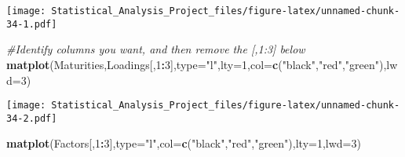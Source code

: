 \documentclass[]{article}
\newenvironment{Shaded}{\begin{snugshade}}{\end{snugshade}}
\newcommand{\KeywordTok}[1]{\textcolor[rgb]{0.13,0.29,0.53}{\textbf{#1}}}
\newcommand{\DataTypeTok}[1]{\textcolor[rgb]{0.13,0.29,0.53}{#1}}
\newcommand{\DecValTok}[1]{\textcolor[rgb]{0.00,0.00,0.81}{#1}}
\newcommand{\StringTok}[1]{\textcolor[rgb]{0.31,0.60,0.02}{#1}}
\newcommand{\CommentTok}[1]{\textcolor[rgb]{0.56,0.35,0.01}{\textit{#1}}}
\newcommand{\OperatorTok}[1]{\textcolor[rgb]{0.81,0.36,0.00}{\textbf{#1}}}
\newcommand{\NormalTok}[1]{#1}
\begin{document}
\texttt{[image: Statistical\_Analysis\_Project\_files/figure-latex/unnamed-chunk-34-1.pdf]}

\begin{Shaded}
\begin{Highlighting}[]
\CommentTok{#Identify columns you want, and then remove the [,1:3] below}
\KeywordTok{matplot}\NormalTok{(Maturities,Loadings[,}\DecValTok{1}\OperatorTok{:}\DecValTok{3}\NormalTok{],}\DataTypeTok{type=}\StringTok{"l"}\NormalTok{,}\DataTypeTok{lty=}\DecValTok{1}\NormalTok{,}\DataTypeTok{col=}\KeywordTok{c}\NormalTok{(}\StringTok{"black"}\NormalTok{,}\StringTok{"red"}\NormalTok{,}\StringTok{"green"}\NormalTok{),}\DataTypeTok{lwd=}\DecValTok{3}\NormalTok{)}
\end{Highlighting}
\end{Shaded}

\texttt{[image: Statistical\_Analysis\_Project\_files/figure-latex/unnamed-chunk-34-2.pdf]}

\begin{Shaded}
\begin{Highlighting}[]
\KeywordTok{matplot}\NormalTok{(Factors[,}\DecValTok{1}\OperatorTok{:}\DecValTok{3}\NormalTok{],}\DataTypeTok{type=}\StringTok{"l"}\NormalTok{,}\DataTypeTok{col=}\KeywordTok{c}\NormalTok{(}\StringTok{"black"}\NormalTok{,}\StringTok{"red"}\NormalTok{,}\StringTok{"green"}\NormalTok{),}\DataTypeTok{lty=}\DecValTok{1}\NormalTok{,}\DataTypeTok{lwd=}\DecValTok{3}\NormalTok{)}
\end{Highlighting}
\end{Shaded}
\end{document}
